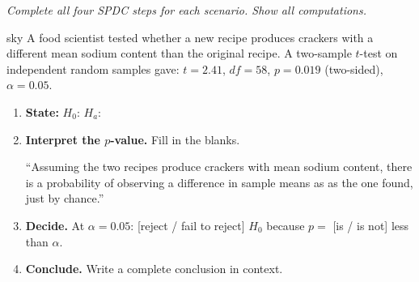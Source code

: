 \documentclass[10pt]{article}
\begin{document}
\namepartnerperiod

\vspace{0.1in}

\textit{Complete all four SPDC steps for each scenario. Show all computations.}

\begin{scenariobox}{sky}
A food scientist tested whether a new recipe produces crackers with a different mean
sodium content than the original recipe. A two-sample $t$-test on independent random
samples gave: $t = 2.41$, $df = 58$, $p = 0.019$ (two-sided), $\alpha = 0.05$.

\begin{enumerate}[label=\alph*.]
  \item \textbf{State:} $H_0$: \blank{5cm} \quad $H_a$: \blank{5cm}
  \item \textbf{Interpret the $p$-value.} Fill in the blanks.

        ``Assuming the two recipes produce crackers with \blank{4cm} mean sodium content,
        there is a \blank{1.5cm} probability of observing a difference in sample means
        as \blank{3cm} as the one found, just by chance.''

  \item \textbf{Decide.} At $\alpha = 0.05$: [reject / fail to reject] $H_0$
        because $p = $ \blank{1.5cm} [is / is not] less than $\alpha$.

  \item \textbf{Conclude.} Write a complete conclusion in context.
\end{enumerate}
\end{scenariobox}
\end{document}
